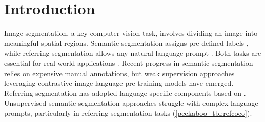 



\section{Introduction}


\label{peekaboo_sec:intro}

Image segmentation, a key computer vision task, involves dividing an image into meaningful spatial regions. Semantic segmentation assigns pre-defined labels \cite{coco}, while referring segmentation allows any natural language prompt \cite{hu2016segmentation}. Both tasks are essential for real-world applications \cite{sun2020scalability}.
Recent progress in semantic segmentation \cite{chen2017deeplab,chen2018searching} relies on expensive manual annotations, but weak supervision approaches \cite{Ghiasi2021OpenVocabularyIS,li2022language} leveraging contrastive image language pre-training models \cite{clip,jia2021scaling} have emerged. Referring segmentation has adopted language-specific components \cite{Wang2022CRISCR} based on \cite{clip}. Unsupervised semantic segmentation approaches \cite{Xu2022GroupViTSS,Ranasinghe2022PerceptualGI} struggle with complex language prompts, particularly in referring segmentation tasks (\cref{peekaboo_tbl:refcoco}).

